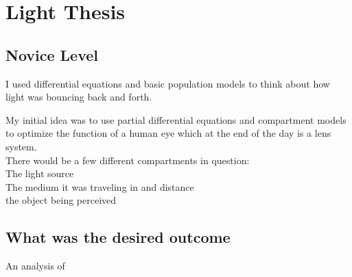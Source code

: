 \section{Light Thesis}


\subsection{Novice Level}
I used differential equations and basic population models to think about how light was bouncing back and forth. 

My initial idea was to use partial differential equations and compartment models to optimize the function of a human eye which at the end of the day is a lens system. \\ 

There would be a few different compartments in question: \\ 
The light source \\

The medium it was traveling in and distance \\ 

the object being perceived \\ 

\subsection{What was the desired outcome}
An analysis of 

